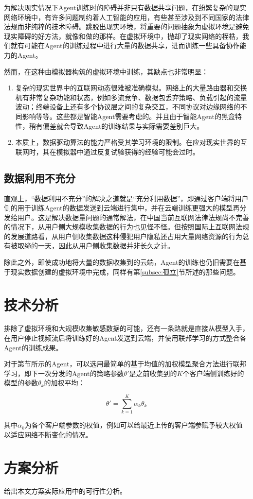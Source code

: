 \documentclass[a4paper]{ctexart}
\begin{document}
为解决现实情况下Agent训练时的障碍并非只有数据共享问题，在纷繁复杂的现实网络环境中，有许多问题制约着人工智能的应用，有些甚至涉及到不同国家的法律法规而非纯粹的技术障碍。跳脱出现实环境，将重要的问题抽象为虚拟环境是避免现实障碍的好方法，就像\cite{mao2020real}和\cite{zhou2019learning}做的那样。在虚拟环境中，抛却了现实网络的桎梏，我们就有可能在Agent的训练过程中进行大量的数据共享，进而训练一些具备协作能力的Agent。

然而，在这种由模拟器构筑的虚拟环境中训练，其缺点也非常明显：
\begin{enumerate}[label=\arabic*、]
	\item 复杂的现实世界中的互联网动态很难被准确模拟\cite{yan2018pantheon}。网络上的大量路由器和交换机有非常复杂功能和状态，例如多流竞争、数据包丢弃策略、负载引起的流量波动；终端设备上还有多个协议层之间的复杂交互，不同协议对边缘网络的不同影响等等。这些都是智能Agent需要考虑的。并且由于智能Agent的黑盒特性，稍有偏差就会导致Agent的训练结果与实际需要差别巨大。
	\item 本质上，数据驱动算法的能力严格受其学习环境的限制。在应对现实世界的互联网时，其在模拟器中通过反复试验获得的经验可能会过时。
\end{enumerate}

\subsection{数据利用不充分}

直观上，“数据利用不充分”的解决之道就是“充分利用数据”，即通过客户端将用户侧的用于训练Agent的数据发送到云端进行集中，并在云端训练更强大的模型再分发给用户。这是解决数据量问题的通常解法，在中国当前互联网法律法规尚不完善的情况下，从用户侧大规模收集数据的行为也见怪不怪。但按照国际上互联网法规的发展道路看，从用户侧收集数据这种侵犯用户隐私还占用大量网络资源的行为总有被取缔的一天，因此从用户侧收集数据并非长久之计。

除此之外，即使成功地将大量的数据收集到的云端，Agent的训练也仍旧需要在基于现实数据创建的虚拟环境中完成，同样有第\ref{subsec:孤立}节所述的那些问题。

\section{技术分析}

排除了虚拟环境和大规模收集敏感数据的可能，还有一条路就是直接从模型入手，在用户停止视频流后将训练好的Agent发送到云端，并使用联邦学习的方式整合各Agent的训练成果。

对于第\label{sec:智能Agent结构}节所示的Agent，可以选用最简单的基于均值的加权模型聚合方法进行联邦学习\cite{goodfellow2014qualitatively,mcmahan2017communication}，即下一次分发的Agent的策略参数$\theta'$是之前收集到的$K$个客户端侧训练好的模型的参数$\theta_k$的加权平均：

$$\theta'=\sum_{k=1}^K\alpha_k\theta_k$$

其中$\alpha_k$为各个客户端参数的权值，例如可以给最近上传的客户端参赋予较大权值以适应网络不断变化的情况。

\section{方案分析}
给出本文方案实际应用中的可行性分析。

\end{document}
